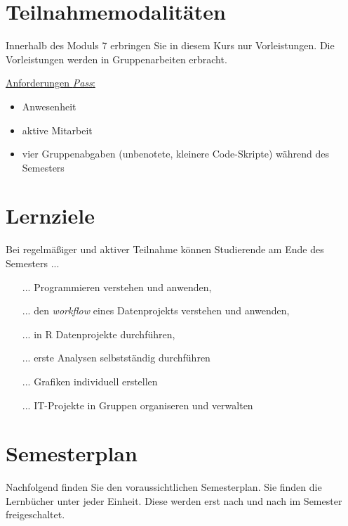 \documentclass[11pt,a4paper]{article}
\begin{document}
\section*{Teilnahmemodalitäten}
Innerhalb des Moduls 7 erbringen Sie in diesem Kurs nur Vorleistungen. Die Vorleistungen werden in Gruppenarbeiten erbracht.
\newline

\underline{Anforderungen \textit{Pass}:}
\begin{itemize}
	\item Anwesenheit
	\item aktive Mitarbeit
	\item vier Gruppenabgaben (unbenotete, kleinere Code-Skripte) während des Semesters
\end{itemize}
	
\section*{Lernziele}
Bei regelmäßiger und aktiver Teilnahme können Studierende am Ende des Semesters ...
\begin{itemize}
	\item[...] Programmieren verstehen und anwenden,
	\item[...] den \textit{workflow} eines Datenprojekts verstehen und anwenden,
	\item[...] in R Datenprojekte durchführen,
	\item[...] erste Analysen selbstständig durchführen
	\item[...] Grafiken individuell erstellen
	\item[...] IT-Projekte in Gruppen organiseren und verwalten
\end{itemize}

\section*{Semesterplan}
Nachfolgend finden Sie den voraussichtlichen Semesterplan. Sie finden die Lernbücher unter jeder Einheit. Diese werden erst nach und nach im Semester freigeschaltet.
\end{document}
